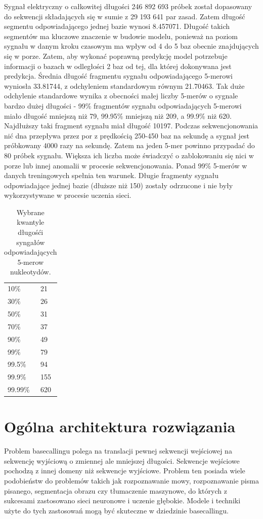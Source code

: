 \documentclass[a4paper,11pt,twoside]{report}
\theoremstyle{definition}
\begin{document}
Sygnał elektryczny o całkowitej długości 246 892 693 próbek został dopasowany do sekwencji składających się w sumie z 29 193 641 par zasad. Zatem długość segmentu odpowiadającego jednej bazie wynosi 8.457071. Długość takich segmentów ma kluczowe znaczenie w budowie modelu, ponieważ na poziom sygnału w danym kroku czasowym ma wpływ od 4 do 5 baz obecnie znajdujących się w porze. Zatem, aby wykonać poprawną predykcję model potrzebuje informacji o bazach w odległości 2 baz od tej, dla której dokonywana jest predykcja. Średnia długość fragmentu sygnału odpowiadającego 5-merowi wyniosła 33.81744, z odchyleniem standardowym równym 21.70463. Tak duże odchylenie standardowe wynika z obecności małej liczby 5-merów o sygnale bardzo dużej długości - 99\% fragmentów sygnału odpowiadających 5-merowi miało długość mniejszą niż 79, 99.95\% mniejszą niż 209, a 99.9\% niż 620. Najdłuższy taki fragment sygnału miał długość 10197. Podczas sekwencjonowania nić dna przepływa przez por z prędkością 250-450 baz na sekundę a sygnał jest próbkowany 4000 razy na sekundę. Zatem na jeden 5-mer powinno przypadać do 80 próbek sygnału. Większa ich liczba może świadczyć o zablokowaniu się nici w porze lub innej anomalii w procesie sekwencjonowania. Ponad 99\% 5-merów w danych treningowych spełnia ten warunek. Długie fragmenty sygnału odpowiadające jednej bazie (dłuższe niż 150) zostały odrzucone i nie były wykorzystywane w procesie uczenia sieci.

\begin{table}[]
	\centering
	\begin{tabular}{ll}
		10\%    & 21  \\
		30\%    & 26  \\
		50\%    & 31  \\
		70\%    & 37  \\
		90\%    & 49  \\
		99\%    & 79  \\
		99.5\%  & 94  \\
		99.9\%  & 155 \\
		99.99\% & 620
	\end{tabular}
	\caption{\label{}Wybrane kwantyle długośći syngałów odpowiadających 5-merow nukleotydów.}
\end{table}

\section{Ogólna architektura rozwiązania}

Problem basecallingu polega na translacji pewnej sekwencji wejściowej na sekwencję wyjściową o zmiennej ale mniejszej długości. Sekwencje wejściowe pochodzą z innej domeny niż sekwencje wyjściowe. Problem ten posiada wiele podobieństw do problemów takich jak rozpoznawanie mowy, rozpoznawanie pisma pisanego, segmentacja obrazu czy tłumaczenie maszynowe, do których z sukcesami zastosowano sieci neuronowe i uczenie głębokie. Modele i techniki użyte do tych zastosowań mogą być skuteczne w dziedzinie basecallingu.
\end{document}
